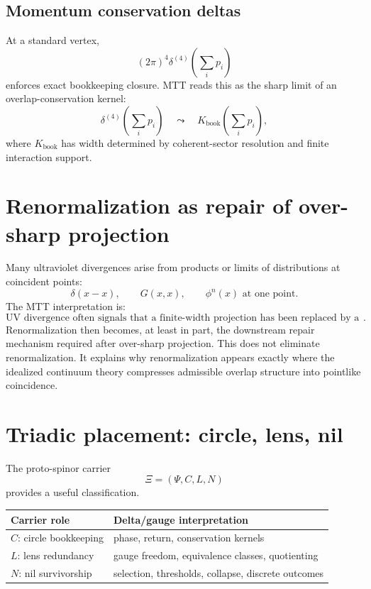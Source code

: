 \documentclass[11pt]{article}
\begin{document}
\subsection{Momentum conservation deltas}

At a standard vertex,
\begin{equation}
(2\pi)^4\delta^{(4)}\left(\sum_i p_i\right)
\end{equation}
enforces exact bookkeeping closure.  MTT reads this as the sharp limit of an
overlap-conservation kernel:
\begin{equation}
\delta^{(4)}\left(\sum_i p_i\right)
\quad\leadsto\quad
K_{\mathrm{book}}\left(\sum_i p_i\right),
\end{equation}
where \(K_{\mathrm{book}}\) has width determined by coherent-sector resolution and finite
interaction support.

\section{Renormalization as repair of over-sharp projection}

Many ultraviolet divergences arise from products or limits of distributions at coincident
points:
\begin{equation}
\delta(x-x),\qquad G(x,x),\qquad \phi^n(x)\text{ at one point}.
\end{equation}
The MTT interpretation is:
\[
\boxed{\text{UV divergence often signals that a finite-width projection has been replaced by a zero-width delta}.}
\]
Renormalization then becomes, at least in part, the downstream repair mechanism required
after over-sharp projection. This does not eliminate renormalization. It explains why
renormalization appears exactly where the idealized continuum theory compresses admissible
overlap structure into pointlike coincidence.

\section{Triadic placement: circle, lens, nil}

The proto-spinor carrier
\begin{equation}
\Xi=(\Psi,C,L,N)
\end{equation}
provides a useful classification.

\begin{center}
\begin{tabular}{ll}
Carrier role & Delta/gauge interpretation\\
\hline
\(C\): circle bookkeeping & phase, return, conservation kernels\\
\(L\): lens redundancy & gauge freedom, equivalence classes, quotienting\\
\(N\): nil survivorship & selection, thresholds, collapse, discrete outcomes
\end{tabular}
\end{center}
\end{document}
